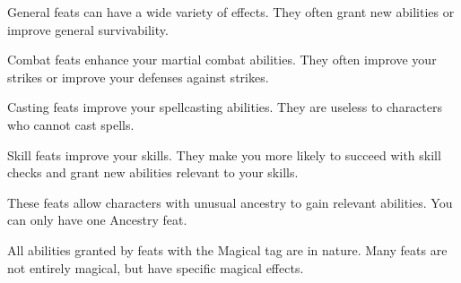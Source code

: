      General feats can have a wide variety of effects.
    They often grant new abilities or improve general survivability.

     Combat feats enhance your martial combat abilities.
    They often improve your strikes or improve your defenses against strikes.

     Casting feats improve your spellcasting abilities.
    They are useless to characters who cannot cast spells.

     Skill feats improve your skills.
    They make you more likely to succeed with skill checks and grant new abilities relevant to your skills.

     These feats allow characters with unusual ancestry to gain relevant abilities.
    You can only have one Ancestry feat.

    All abilities granted by feats with the Magical tag are \magical in nature.
    Many feats are not entirely magical, but have specific magical effects.

